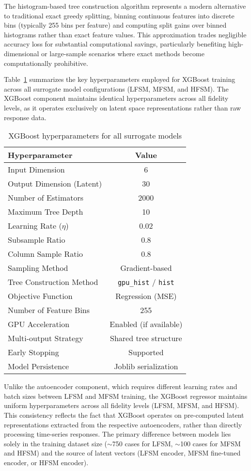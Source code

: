 \documentclass[12pt,a4paper]{report}
\begin{document}
The histogram-based tree construction algorithm represents a modern alternative to traditional exact greedy splitting, binning continuous features into discrete bins (typically 255 bins per feature) and computing split gains over binned histograms rather than exact feature values. This approximation trades negligible accuracy loss for substantial computational savings, particularly benefiting high-dimensional or large-sample scenarios where exact methods become computationally prohibitive.

Table~\ref{tab:xgb_hyperparameters} summarizes the key hyperparameters employed for XGBoost training across all surrogate model configurations (LFSM, MFSM, and HFSM). The XGBoost component maintains identical hyperparameters across all fidelity levels, as it operates exclusively on latent space representations rather than raw response data.

\begin{table}[htbp]
\centering
\caption{XGBoost hyperparameters for all surrogate models}
\label{tab:xgb_hyperparameters}
\begin{tabular}{lc}
\hline
\textbf{Hyperparameter} & \textbf{Value} \\
\hline
Input Dimension & 6 \\
Output Dimension (Latent) & 30 \\
Number of Estimators & 2000 \\
Maximum Tree Depth & 10 \\
Learning Rate ($\eta$) & 0.02 \\
Subsample Ratio & 0.8 \\
Column Sample Ratio & 0.8 \\
Sampling Method & Gradient-based \\
Tree Construction Method & \texttt{gpu\_hist} / \texttt{hist} \\
Objective Function & Regression (MSE) \\
Number of Feature Bins & 255 \\
GPU Acceleration & Enabled (if available) \\
Multi-output Strategy & Shared tree structure \\
Early Stopping & Supported \\
Model Persistence & Joblib serialization \\
\hline
\end{tabular}
\end{table}

Unlike the autoencoder component, which requires different learning rates and batch sizes between LFSM and MFSM training, the XGBoost regressor maintains uniform hyperparameters across all fidelity levels (LFSM, MFSM, and HFSM). This consistency reflects the fact that XGBoost operates on pre-computed latent representations extracted from the respective autoencoders, rather than directly processing time-series responses. The primary difference between models lies solely in the training dataset size ($\sim$750 cases for LFSM, $\sim$100 cases for MFSM and HFSM) and the source of latent vectors (LFSM encoder, MFSM fine-tuned encoder, or HFSM encoder).
\end{document}
